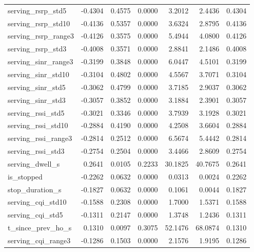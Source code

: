 \begin{tabular}{lrrrrrr}
serving\_rsrp\_std5 & -0.4304 & 0.4575 & 0.0000 & 3.2012 & 2.4436 & 0.4304 \\
serving\_rsrp\_std10 & -0.4136 & 0.5357 & 0.0000 & 3.6324 & 2.8795 & 0.4136 \\
serving\_rsrp\_range3 & -0.4126 & 0.3575 & 0.0000 & 5.4944 & 4.0800 & 0.4126 \\
serving\_rsrp\_std3 & -0.4008 & 0.3571 & 0.0000 & 2.8841 & 2.1486 & 0.4008 \\
serving\_sinr\_range3 & -0.3199 & 0.3848 & 0.0000 & 6.0447 & 4.5101 & 0.3199 \\
serving\_sinr\_std10 & -0.3104 & 0.4802 & 0.0000 & 4.5567 & 3.7071 & 0.3104 \\
serving\_sinr\_std5 & -0.3062 & 0.4799 & 0.0000 & 3.7185 & 2.9037 & 0.3062 \\
serving\_sinr\_std3 & -0.3057 & 0.3852 & 0.0000 & 3.1884 & 2.3901 & 0.3057 \\
serving\_rssi\_std5 & -0.3021 & 0.3346 & 0.0000 & 3.7939 & 3.1928 & 0.3021 \\
serving\_rssi\_std10 & -0.2884 & 0.4190 & 0.0000 & 4.2508 & 3.6604 & 0.2884 \\
serving\_rssi\_range3 & -0.2814 & 0.2512 & 0.0000 & 6.5674 & 5.4442 & 0.2814 \\
serving\_rssi\_std3 & -0.2754 & 0.2504 & 0.0000 & 3.4466 & 2.8609 & 0.2754 \\
serving\_dwell\_s & 0.2641 & 0.0105 & 0.2233 & 30.1825 & 40.7675 & 0.2641 \\
is\_stopped & -0.2262 & 0.0632 & 0.0000 & 0.0313 & 0.0024 & 0.2262 \\
stop\_duration\_s & -0.1827 & 0.0632 & 0.0000 & 0.1061 & 0.0044 & 0.1827 \\
serving\_cqi\_std10 & -0.1588 & 0.2308 & 0.0000 & 1.7000 & 1.5371 & 0.1588 \\
serving\_cqi\_std5 & -0.1311 & 0.2147 & 0.0000 & 1.3748 & 1.2436 & 0.1311 \\
t\_since\_prev\_ho\_s & 0.1310 & 0.0097 & 0.3075 & 52.1476 & 68.0874 & 0.1310 \\
serving\_cqi\_range3 & -0.1286 & 0.1503 & 0.0000 & 2.1576 & 1.9195 & 0.1286 \\
\bottomrule
\end{tabular}
